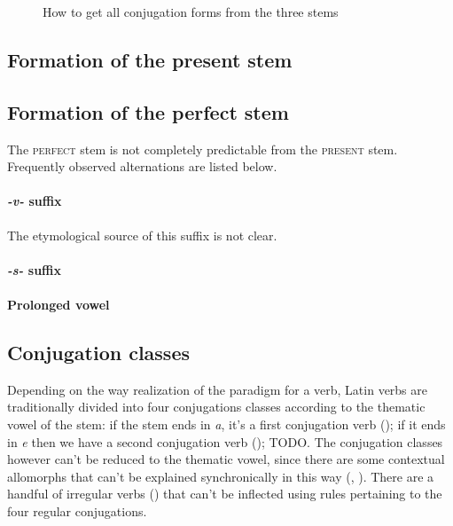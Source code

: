 \documentclass[a4paper, oneside, 12pt]{report}
\newcommand{\form}[1]{\emph{#1}}
\newcommand*{\category}[1]{\textsc{#1}}
\begin{document}
\begin{sidewaysfigure}
    \centering
    {\small }
    \caption{How to get all conjugation forms from the three stems}
    \label{fig:stem-to-form}
\end{sidewaysfigure}

\subsection{Formation of the present stem}


\subsection{Formation of the perfect stem}\label{sec:verb-inflection.stem.perfect}

The \category{perfect} stem is not completely predictable from the \category{present} stem. 
Frequently observed alternations are listed below.

\paragraph*{\form{-v-} suffix} 
The etymological source of this suffix is not clear.

\paragraph*{\form{-s-} suffix}

\paragraph*{Prolonged vowel}

\subsection{Conjugation classes}\label{sec:verb-morphology.stem.conjugation}

Depending on the way realization of the paradigm for a verb,
Latin verbs are traditionally divided into 
four conjugations classes
according to the thematic vowel of the stem:
if the stem ends in \form{a}, 
it's a first conjugation verb ();
if it ends in \form{e} 
then we have a second conjugation verb ();
TODO.
The conjugation classes however can't be reduced to 
the thematic vowel, 
since there are some contextual allomorphs that can't be explained synchronically
in this way
(, ).
There are a handful of irregular verbs ()
that can't be inflected using rules pertaining to the four regular conjugations.
\end{document}
